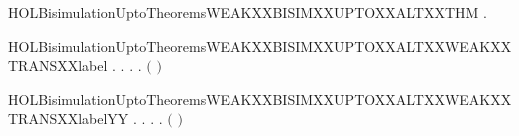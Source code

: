 \newcommand{\HOLBisimulationUptoTheoremsWEAKXXBISIMXXUPTOXXALTXXLEMMA}{\UseVerbatim{HOLBisimulationUptoTheoremsWEAKXXBISIMXXUPTOXXALTXXLEMMA}}
\begin{SaveVerbatim}{HOLBisimulationUptoTheoremsWEAKXXBISIMXXUPTOXXALTXXTHM}
\HOLTokenTurnstile{} \HOLSymConst{\HOLTokenForall{}}.   \HOLSymConst{\HOLTokenImp{}}   
\end{SaveVerbatim}
\newcommand{\HOLBisimulationUptoTheoremsWEAKXXBISIMXXUPTOXXALTXXTHM}{\UseVerbatim{HOLBisimulationUptoTheoremsWEAKXXBISIMXXUPTOXXALTXXTHM}}
\begin{SaveVerbatim}{HOLBisimulationUptoTheoremsWEAKXXBISIMXXUPTOXXALTXXWEAKXXTRANSXXlabel}
\HOLTokenTurnstile{} \HOLSymConst{\HOLTokenForall{}}.
         \HOLSymConst{\HOLTokenImp{}}
       \HOLSymConst{\HOLTokenForall{}} .
              \HOLSymConst{\HOLTokenImp{}}
           \HOLSymConst{\HOLTokenForall{}} .
                \HOLTokenWeakTransBegin{} \HOLTokenWeakTransEnd {} \HOLSymConst{\HOLTokenImp{}}
               \HOLSymConst{\HOLTokenExists{}}.
                    \HOLTokenWeakTransBegin{} \HOLTokenWeakTransEnd {} \HOLSymConst{\HOLTokenConj{}}
                   \ensuremath{(}    \ensuremath{)}  
\end{SaveVerbatim}
\newcommand{\HOLBisimulationUptoTheoremsWEAKXXBISIMXXUPTOXXALTXXWEAKXXTRANSXXlabel}{\UseVerbatim{HOLBisimulationUptoTheoremsWEAKXXBISIMXXUPTOXXALTXXWEAKXXTRANSXXlabel}}
\begin{SaveVerbatim}{HOLBisimulationUptoTheoremsWEAKXXBISIMXXUPTOXXALTXXWEAKXXTRANSXXlabelYY}
\HOLTokenTurnstile{} \HOLSymConst{\HOLTokenForall{}}.
         \HOLSymConst{\HOLTokenImp{}}
       \HOLSymConst{\HOLTokenForall{}} .
              \HOLSymConst{\HOLTokenImp{}}
           \HOLSymConst{\HOLTokenForall{}} .
                \HOLTokenWeakTransBegin{} \HOLTokenWeakTransEnd {} \HOLSymConst{\HOLTokenImp{}}
               \HOLSymConst{\HOLTokenExists{}}.
                    \HOLTokenWeakTransBegin{} \HOLTokenWeakTransEnd {} \HOLSymConst{\HOLTokenConj{}}
                   \ensuremath{(}    \ensuremath{)}  
\end{SaveVerbatim}
